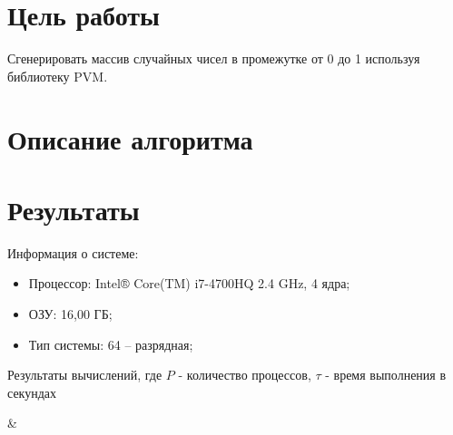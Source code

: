 	\section{Цель работы}
		Сгенерировать массив случайных чисел в промежутке от 0 до 1 используя библиотеку PVM.
	\section{Описание алгоритма}
		
		
	\section{Результаты}
		Информация о системе:
		\begin{itemize}
			\item Процессор: Intel® Core(TM) i7-4700HQ 2.4 GHz, 4 ядра;
			\item ОЗУ: 16,00 ГБ;
			\item Тип системы: 64 – разрядная;
		\end{itemize}
	
		\begin{table}
			\centering
			\caption{Результаты вычислений, где $ P $ - количество процессов,  $ \tau $ - время выполнения в секундах}
			\label{t1}
			{ \pnumber& \ftime}%
		\end{table}